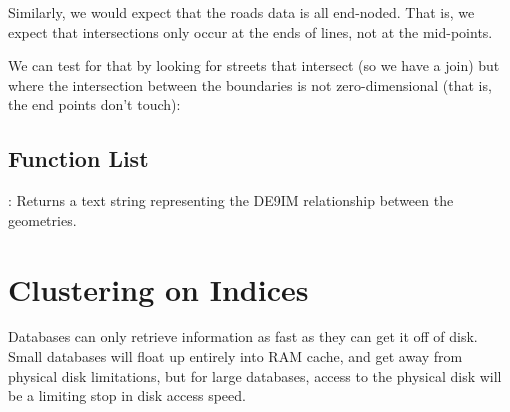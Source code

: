 \documentclass[a4paper,11pt,english]{sphinxmanual}
\begin{document}
Similarly, we would expect that the roads data is all end-noded. That is, we expect that intersections only occur at the ends of lines, not at the mid-points.

\noindent{}

We can test for that by looking for streets that intersect (so we have a join) but where the intersection between the boundaries is not zero-dimensional (that is, the end points don’t touch):

\begin{sphinxVerbatim}[commandchars=\\\{\}]
  
    
  
      
     
 

\end{sphinxVerbatim}


\subsection{Function List}
\label{\detokenize{advanced:id7}}
: Returns a text string representing the DE9IM relationship between the geometries.


\section{Clustering on Indices}
\label{\detokenize{advanced:clustering-on-indices}}\label{\detokenize{advanced:clusterindex}}
Databases can only retrieve information as fast as they can get it off of disk. Small databases will float up entirely into RAM cache, and get away from physical disk limitations, but for large databases, access to the physical disk will be a limiting stop in disk access speed.
\end{document}
